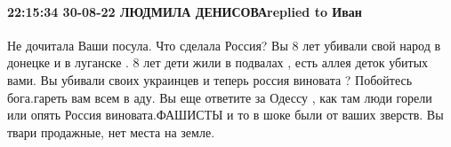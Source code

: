  
 
 
 
 

\paragraph{22:15:34 30-08-22 ЛЮДМИЛА ДЕНИСОВАreplied to Иван}

Не дочитала Ваши посула. Что сделала Россия? Вы 8 лет убивали свой народ в
донецке и в луганске . 8 лет дети жили в подвалах , есть аллея деток убитых
вами. Вы убивали своих украинцев и теперь россия виновата ? Побойтесь
бога.гареть вам всем в аду. Вы еще ответите за Одессу , как там люди горели или
опять Россия виновата.ФАШИСТЫ и то в шоке были от ваших зверств. Вы твари
продажные, нет места на земле.
